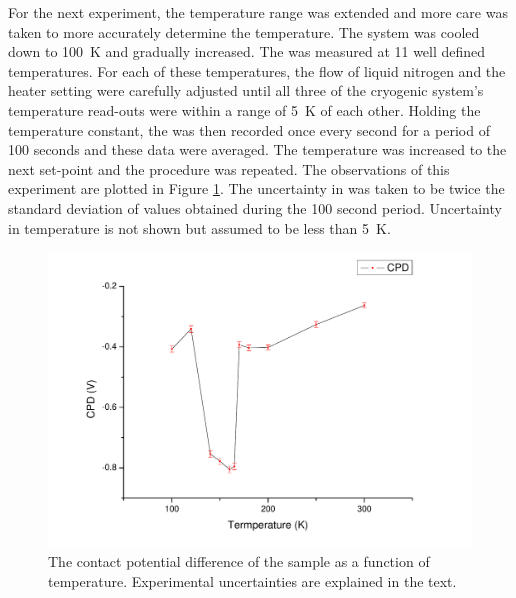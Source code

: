 For the next experiment, the temperature range was extended and more care was taken to more accurately determine the temperature. The system was cooled down to \SI{100}{\kelvin} and gradually increased. The \cpd{} was measured at 11 well defined temperatures. For each of these temperatures, the flow of liquid nitrogen and the heater setting were carefully adjusted until all three of the cryogenic system's temperature read-outs were within a range of \SI{5}{\kelvin} of each other. Holding the temperature constant, the \cpd{} was then recorded once every second for a period of 100 seconds and these data were averaged. The temperature was increased to the next set-point and the procedure was repeated. The observations of this experiment are plotted in Figure \ref{fig:vox2}. The uncertainty in \cpd{} was taken to be twice the standard deviation of \cpd{} values obtained during the 100 second period. Uncertainty in temperature is not shown but assumed to be less than \SI{5}{\kelvin}.\\
\begin{figure}
\centering
	\includegraphics[width=0.8\linewidth]{./figs/chap2/vox2}
	\caption{The contact potential difference of the \wvadiox{} sample as a function of temperature. Experimental uncertainties are explained in the text.}
	\label{fig:vox2}
\end{figure}
